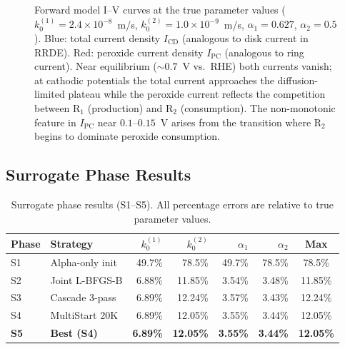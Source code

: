 \documentclass[11pt,a4paper]{article}
\newcommand{\kzero}{k_0}
\begin{document}
\begin{figure}[H]
\caption{Forward model I--V curves at the true parameter values
  ($\kzero^{(1)} = 2.4\times10^{-8}$~m/s,
   $\kzero^{(2)} = 1.0\times10^{-9}$~m/s,
   $\alpha_1 = 0.627$, $\alpha_2 = 0.5$).
  Blue: total current density $I_{\mathrm{CD}}$ (analogous to disk
  current in RRDE). Red: peroxide current density $I_{\mathrm{PC}}$
  (analogous to ring current). Near equilibrium ($\sim\!0.7$~V vs.\ RHE)
  both currents vanish; at cathodic potentials the total current
  approaches the diffusion-limited plateau while the peroxide current
  reflects the competition between R$_1$ (production) and R$_2$
  (consumption). The non-monotonic feature in $I_{\mathrm{PC}}$ near
  $0.1$--$0.15$~V arises from the transition where R$_2$ begins to
  dominate peroxide consumption.}
\label{fig:iv_curves}
\end{figure}

\subsection{Surrogate Phase Results}\label{sec:surr_results}

\begin{table}[H]
\centering
\caption{Surrogate phase results (S1--S5). All percentage errors are
  relative to true parameter values.}
\label{tab:surr_results}
\begin{tabular}{llrrrrc}
\toprule
Phase & Strategy & $\kzero^{(1)}$ & $\kzero^{(2)}$ & $\alpha_1$ & $\alpha_2$ & Max \\
\midrule
S1 & Alpha-only init   & 49.7\%  & 78.5\%  & 49.7\% & 78.5\% & 78.5\% \\
S2 & Joint L-BFGS-B    &  6.88\% & 11.85\% & 3.54\% & 3.48\% & 11.85\% \\
S3 & Cascade 3-pass    &  6.89\% & 12.24\% & 3.57\% & 3.43\% & 12.24\% \\
S4 & MultiStart 20K    &  6.89\% & 12.05\% & 3.55\% & 3.44\% & 12.05\% \\
\midrule
\textbf{S5} & \textbf{Best (S4)} & \textbf{6.89\%} & \textbf{12.05\%}
  & \textbf{3.55\%} & \textbf{3.44\%} & \textbf{12.05\%} \\
\bottomrule
\end{tabular}
\end{table}
\end{document}
